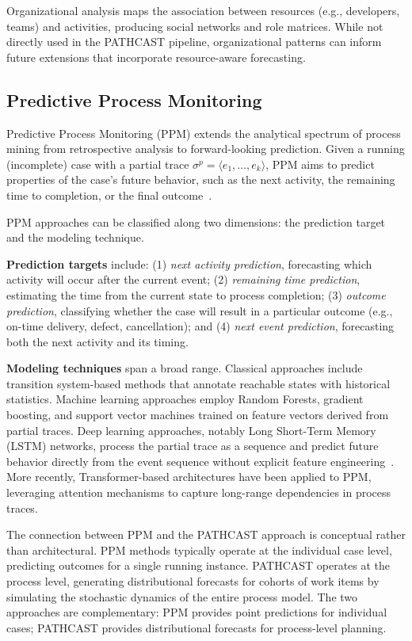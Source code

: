 Organizational analysis maps the association between resources (e.g.,
developers, teams) and activities, producing social networks and role
matrices. While not directly used in the PATHCAST pipeline,
organizational patterns can inform future extensions that incorporate
resource-aware forecasting.


\subsection{Predictive Process Monitoring}
\label{sec:ppm}

Predictive Process Monitoring (PPM) extends the analytical spectrum of
process mining from retrospective analysis to forward-looking prediction.
Given a running (incomplete) case with a partial trace
$\sigma^p = \langle e_1, \ldots, e_k \rangle$, PPM aims to predict
properties of the case's future behavior, such as the next activity, the remaining time to completion, or the final outcome~\cite{tax2017, marquezChamorro2018}.

PPM approaches can be classified along two dimensions: the prediction
target and the modeling technique.

\textbf{Prediction targets} include: (1) \emph{next activity prediction},
forecasting which activity will occur after the current event;
(2) \emph{remaining time prediction}, estimating the time from the
current state to process completion; (3) \emph{outcome prediction},
classifying whether the case will result in a particular outcome (e.g.,
on-time delivery, defect, cancellation); and (4) \emph{next event
prediction}, forecasting both the next activity and its timing.

\textbf{Modeling techniques} span a broad range. Classical approaches
include transition system-based methods that annotate reachable states
with historical statistics. Machine learning approaches employ Random
Forests, gradient boosting, and support vector machines trained on feature
vectors derived from partial traces. Deep learning approaches, notably
Long Short-Term Memory (LSTM) networks, process the partial trace as a
sequence and predict future behavior directly from the event sequence
without explicit feature engineering~\cite{tax2017}. More
recently, Transformer-based architectures have been applied to PPM,
leveraging attention mechanisms to capture long-range dependencies in
process traces.

The connection between PPM and the PATHCAST approach is conceptual
rather than architectural. PPM methods typically operate at the individual
case level, predicting outcomes for a single running instance. PATHCAST
operates at the process level, generating distributional forecasts for
cohorts of work items by simulating the stochastic dynamics of the
entire process model. The two approaches are complementary: PPM provides
point predictions for individual cases; PATHCAST provides
distributional forecasts for process-level planning.

